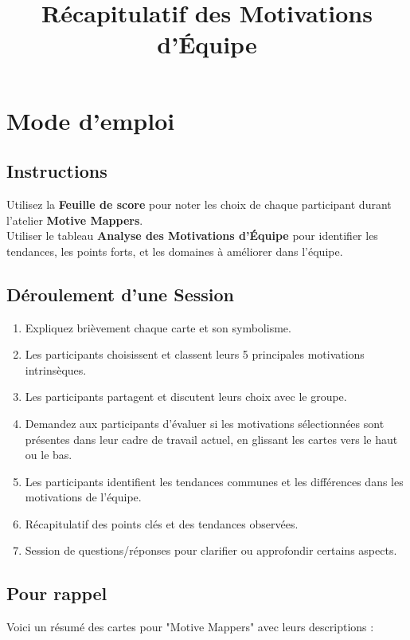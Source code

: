 \documentclass[parskip=full]{scrartcl}
\title{Récapitulatif des Motivations d'Équipe}
\date{}
\begin{document}
\section*{Mode d'emploi}
\begin{minipage}[t]{\textwidth}
    \begin{multicols}{2}
        \subsection*{Instructions}
        Utilisez la \textbf{Feuille de score} pour noter les choix de chaque participant durant l'atelier \textbf{Motive Mappers}.\\

        Utiliser le tableau \textbf{Analyse des Motivations d'Équipe} pour identifier les tendances, les points forts, et les domaines à améliorer dans l'équipe.

        \subsection*{Déroulement d'une Session}

        \begin{enumerate}
            \item Expliquez brièvement chaque carte et son symbolisme.
            \item Les participants choisissent et classent leurs 5 principales motivations intrinsèques.
            \item Les participants partagent et discutent leurs choix avec le groupe.
            \item Demandez aux participants d'évaluer si les motivations sélectionnées sont présentes dans leur cadre de travail actuel, en glissant les cartes vers le haut ou le bas.
            \item Les participants identifient les tendances communes et les différences dans les motivations de l'équipe.
            \item Récapitulatif des points clés et des tendances observées.
            \item Session de questions/réponses pour clarifier ou approfondir certains aspects.
        \end{enumerate}

        \subsection*{Pour rappel}
        Voici un résumé des cartes pour "Motive Mappers" avec leurs descriptions :


\end{multicols}
\end{minipage}
\end{document}
